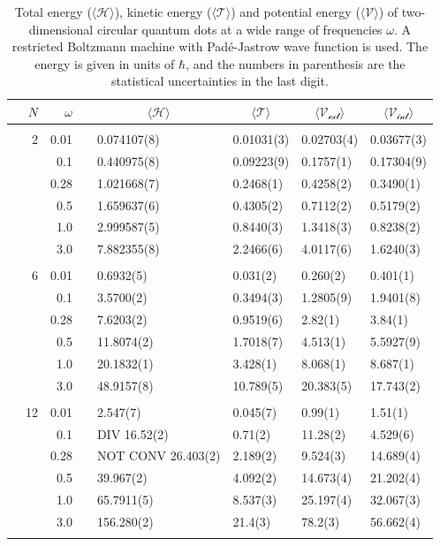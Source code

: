 \begin{table}
	\caption{Total energy ($\langle\mathcal{H}\rangle$), kinetic energy ($\langle\mathcal{T}\rangle$) and potential energy ($\langle\mathcal{V}\rangle$) of two-dimensional circular quantum dots at a wide range of frequencies $\omega$. A restricted Boltzmann machine with Padé-Jastrow wave function is used. The energy is given in units of $\hbar$, and the numbers in parenthesis are the statistical uncertainties in the last digit.}
	\label{tab:splitfrequencyQDRBMPJ}
	\begin{tabularx}{\textwidth}{R{1.5cm}rrcR{2.3cm}R{2.3cm}R{2.3cm}R{2.3cm}} \hline\hline
		& & $\omega$ &&  &  &  &  \\ \hline \\
		&2 & 0.01 && 0.074107(8) & 0.01031(3) & 0.02703(4) & 0.03677(3) \\
		&& 0.1 && 0.440975(8) & 0.09223(9) & 0.1757(1) & 0.17304(9) \\
		&& 0.28 && 1.021668(7) & 0.2468(1) & 0.4258(2) & 0.3490(1) \\
		&& 0.5 && 1.659637(6) & 0.4305(2) & 0.7112(2) & 0.5179(2)\\
		&& 1.0 && 2.999587(5) & 0.8440(3) & 1.3418(3) & 0.8238(2)\\
		&& 3.0 && 7.882355(8) & 2.2466(6) & 4.0117(6) & 1.6240(3) \\ \hdashline \\
		
		&6 & 0.01 && 0.6932(5) & 0.031(2) & 0.260(2) & 0.401(1) \\
		&& 0.1 && 3.5700(2) & 0.3494(3) & 1.2805(9) & 1.9401(8) \\
		&& 0.28 && 7.6203(2) & 0.9519(6) & 2.82(1) & 3.84(1) \\
		&& 0.5 && 11.8074(2) & 1.7018(7) & 4.513(1) & 5.5927(9) \\
		&& 1.0 && 20.1832(1) & 3.428(1) & 8.068(1) & 8.687(1) \\
		&& 3.0 && 48.9157(8) & 10.789(5) & 20.383(5) & 17.743(2) \\ \hdashline \\
		
		&12 & 0.01 && 2.547(7) & 0.045(7) & 0.99(1) & 1.51(1) \\
		&& 0.1 && DIV 16.52(2) & 0.71(2) & 11.28(2) & 4.529(6) \\
		&& 0.28 && NOT CONV 26.403(2) & 2.189(2) & 9.524(3) & 14.689(4) \\
		&& 0.5 && 39.967(2) & 4.092(2) & 14.673(4) & 21.202(4) \\
		&& 1.0 && 65.7911(5) & 8.537(3) & 25.197(4) & 32.067(3) \\
		&& 3.0 && 156.280(2) & 21.4(3) & 78.2(3) & 56.662(4) \\ \hdashline \\
		

\end{tabularx}
\end{table}
